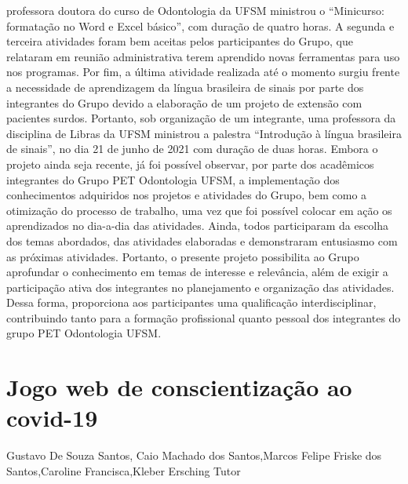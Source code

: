 professora doutora do curso de Odontologia da UFSM ministrou o “Minicurso: formatação no 
Word e Excel básico”, com duração de quatro horas. A segunda e terceira atividades foram bem 
aceitas pelos participantes do Grupo, que relataram em reunião administrativa terem aprendido 
novas ferramentas para uso nos programas. Por fim, a última atividade realizada até o momento 
surgiu frente a necessidade de aprendizagem da língua brasileira de sinais por parte dos integrantes 
do Grupo devido a elaboração de um projeto de extensão com pacientes surdos. Portanto, sob 
organização de um integrante, uma professora da disciplina de Libras da UFSM ministrou a 
palestra “Introdução à língua brasileira de sinais”, no dia 21 de junho de 2021 com duração de 
duas horas. Embora o projeto ainda seja recente, já foi possível observar, por parte dos acadêmicos 
integrantes do Grupo PET Odontologia UFSM, a implementação dos conhecimentos adquiridos 
nos projetos e atividades do Grupo, bem como a otimização do processo de trabalho, uma vez que 
foi possível colocar em ação os aprendizados no dia-a-dia das atividades. Ainda, todos 
participaram da escolha dos temas abordados, das atividades elaboradas e demonstraram 
entusiasmo com as próximas atividades. Portanto, o presente projeto possibilita ao Grupo 
aprofundar o conhecimento em temas de interesse e relevância, além de exigir a participação ativa 
dos integrantes no planejamento e organização das atividades. Dessa forma, proporciona aos 
participantes uma qualificação interdisciplinar, contribuindo tanto para a formação profissional 
quanto pessoal dos integrantes do grupo PET Odontologia UFSM.



\section{Jogo web de conscientização ao covid-19}

Gustavo De Souza Santos, Caio Machado dos Santos,Marcos Felipe Friske dos Santos,Caroline Francisca,Kleber Ersching Tutor

